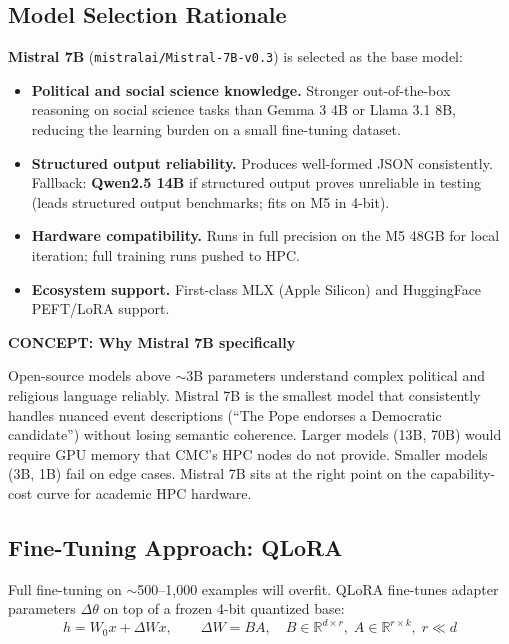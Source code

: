 \documentclass[11pt]{article}
\newcommand{\concept}[2]{%
  \begin{mdframed}[style=conceptbox]
  {\small\bfseries\color{bluefg}CONCEPT: #1}\par\smallskip #2
  \end{mdframed}}
\begin{document}
\subsection*{Model Selection Rationale}

\textbf{Mistral 7B} (\texttt{mistralai/Mistral-7B-v0.3}) is selected as the base model:

\begin{itemize}[leftmargin=1.6em, itemsep=3pt]
  \item \textbf{Political and social science knowledge.} Stronger out-of-the-box reasoning
        on social science tasks than Gemma 3 4B or Llama 3.1 8B, reducing the learning
        burden on a small fine-tuning dataset.
  \item \textbf{Structured output reliability.} Produces well-formed JSON consistently.
        Fallback: \textbf{Qwen2.5 14B} if structured output proves unreliable in testing
        (leads structured output benchmarks; fits on M5 in 4-bit).
  \item \textbf{Hardware compatibility.} Runs in full precision on the M5 48GB for local
        iteration; full training runs pushed to HPC.
  \item \textbf{Ecosystem support.} First-class MLX (Apple Silicon) and HuggingFace
        PEFT/LoRA support.
\end{itemize}

\concept{Why Mistral 7B specifically}{
Open-source models above $\sim$3B parameters understand complex political and
religious language reliably. Mistral 7B is the smallest model that consistently
handles nuanced event descriptions (``The Pope endorses a Democratic candidate'')
without losing semantic coherence. Larger models (13B, 70B) would require GPU
memory that CMC's HPC nodes do not provide. Smaller models (3B, 1B) fail on
edge cases. Mistral 7B sits at the right point on the capability-cost curve for
academic HPC hardware.
}

\subsection*{Fine-Tuning Approach: QLoRA}

Full fine-tuning on $\sim$500--1{,}000 examples will overfit. QLoRA fine-tunes adapter
parameters $\Delta\theta$ on top of a frozen 4-bit quantized base:
\[
  h = W_0 x + \Delta W x, \qquad \Delta W = BA,
  \quad B \in \mathbb{R}^{d \times r},\; A \in \mathbb{R}^{r \times k},\; r \ll d
\]
\end{document}
